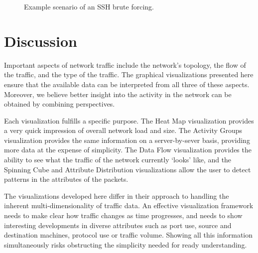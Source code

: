 \begin{figure}[htb]
	\centering
	\caption{\label{fig:ssh} Example scenario of an SSH brute forcing.}
\end{figure}


\section{Discussion} \label{sec:discussion}
%
Important aspects of network traffic include the network's topology, the flow of the
traffic, and the type of the traffic. The graphical visualizations presented here ensure that the
available data can be interpreted from all three of these aspects. Moreover, we believe better
insight into the activity in the network can be obtained by combining perspectives.

Each visualization fulfills a specific purpose. The Heat Map visualization provides a very quick
impression of overall network load and size. The Activity Groups visualization provides the same
information on a server-by-sever basis, providing more data at the expense of simplicity.  The Data
Flow visualization provides the ability to see what the traffic of the network currently `looks'
like, and the Spinning Cube and Attribute Distribution visualizations allow the user to detect
patterns in the attributes of the packets.

The visualizations developed here differ in their approach to handling the inherent
multi-dimensionality of traffic data. An effective visualization framework needs to make clear how
traffic changes as time progresses, and needs to show interesting developments in diverse attributes
such as port use, source and destination machines, protocol use or traffic volume. Showing all this
information simultaneously risks obstructing the simplicity needed for ready understanding. 

